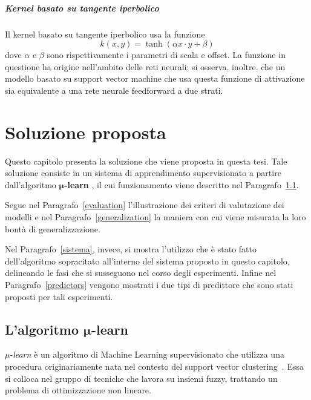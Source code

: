 \documentclass[12pt]{report}
\theoremstyle{definition}
\begin{document}
\paragraph{Kernel basato su tangente iperbolico}
Il kernel basato su tangente iperbolico usa la funzione
\begin{equation}
    k(x,y) = \tanh(\alpha x \cdot y + \beta)
\end{equation}
dove $\alpha$ e $\beta$ sono rispettivamente i parametri di scala e offset. La funzione in questione ha origine nell'ambito delle reti neurali; si osserva, inoltre, che un modello basato su support vector machine che usa questa funzione di attivazione sia equivalente a una rete neurale feedforward a due strati.

\chapter{Soluzione proposta}
\label{Capitolo 2}
\onehalfspacing
Questo capitolo presenta la soluzione che viene proposta in questa tesi.
Tale soluzione consiste in un sistema di apprendimento supervisionato a partire dall'algoritmo $\bm{\mu}$\textbf{-learn} \cite{1}, il cui funzionamento viene descritto nel Paragrafo~\ref{mulearn}.

Segue nel Paragrafo~\ref{evaluation} l'illustrazione dei criteri di valutazione dei modelli e nel Paragrafo~\ref{generalization} la maniera con cui viene misurata la loro bontà di generalizzazione.

Nel Paragrafo~\ref{sistema}, invece, si mostra l'utilizzo che è stato fatto dell'algoritmo sopracitato all'interno del sistema proposto in questo capitolo, delineando le fasi che si susseguono nel corso degli esperimenti. Infine nel Paragrafo~\ref{predictors} vengono mostrati i due tipi di predittore che sono stati proposti per tali esperimenti.

\section[\texorpdfstring{L'algoritmo $\mu$-learn}%
                        {mu-learn}]%
        {L'algoritmo $\bm{\mu}$-learn}  %
\label{mulearn}
$\mu$-\textit{learn} è un algoritmo di Machine Learning supervisionato che utilizza una procedura originariamente nata nel contesto del support vector clustering~\cite{23}.
Essa si colloca nel gruppo di tecniche che lavora su insiemi fuzzy, trattando un problema di ottimizzazione non lineare.
\end{document}
